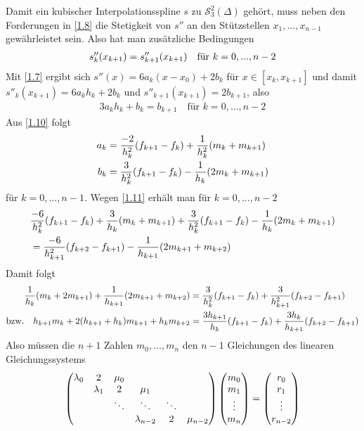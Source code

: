 Damit ein kubischer Interpolationsspline $s$ zu $\mathcal{S}^2_3(\Delta)$ gehört, muss neben den Forderungen in \cref{1.8} die Stetigkeit von $s''$ an den Stützstellen $x_1,...,x_{n-1}$ gewährleistet sein. Also hat man zusätzliche Bedingungen
\begin{align}
	s''_k(x_{k+1})=s''_{k+1}(x_{k+1})\quad\text{für } k=0,...,n-2\notag
\end{align}
Mit \cref{1.7} ergibt sich $s''(x)=6a_k(x-x_0)+2b_k$ für $x\in[x_k,x_{k+1}]$ und damit $s''_k(x_{k+1}) = 6a_kh_k+2b_k$ und $s''_{k+1}(x_{k+1})=2b_{k+1}$, also 
\begin{align}
	\label{1.11}
	3a_kh_k+b_k=b_{k+1}\quad\text{für }k=0,...,n-2
\end{align}
Aus \cref{1.10} folgt
\begin{align}
	a_k &= \frac{-2}{h_k^2}(f_{k+1}-f_k)+\frac{1}{h_k^2}(m_k+m_{k+1}) \notag \\
	b_k &= \frac{3}{h_k^2}(f_{k+1}-f_k)-\frac{1}{h_k}(2m_k+m_{k+1})\notag
\end{align}
für $k=0,...,n-1$. Wegen \cref{1.11} erhält man für $k=0,...,n-2$
\begin{align}
	& \frac{-6}{h_k^2}(f_{k+1}-f_k) + \frac{3}{h_k}(m_k+m_{k+1}) + \frac{3}{h_k^2}(f_{k+1}-f_k) - \frac{1}{h_k}(2m_k+m_{k+1}) \notag \\
	&= \frac{-6}{h^2_{k+1}}(f_{k+2}-f_{k+1})-\frac{1}{h_{k+1}}(2m_{k+1}+m_{k+2})\notag
\end{align}
Damit folgt 
\begin{align}
	\frac{1}{h_k}(m_k+2m_{k+1}) + \frac{1}{h_{k+1}}(2m_{k+1}+m_{k+2}) &= \frac{3}{h_k^2}(f_{k+1}-f_k) + \frac{3}{h_{k+1}^2}(f_{k+2}-f_{k+1})\notag \\
	\text{bzw.}\quad h_{k+1}m_k + 2(h_{k+1}+h_k)m_{k+1}+h_km_{k+2} &= \frac{3h_{k+1}}{h_k}(f_{k+1}-f_k) + \frac{3h_k}{h_{k+1}}(f_{k+2}-f_{k+1})\notag
\end{align}
Also müssen die $n+1$ Zahlen $m_0,...,m_n$ den $n-1$ Gleichungen des linearen Gleichungssystems 
\begin{align}
	\begin{pmatrix}
		\lambda_0 & 2 & \mu_0 & & & \\
		 & \lambda_1 & 2 & \mu_1 & & \\
		 & & \ddots & \ddots & \ddots & \\
		 & & & \lambda_{n-2} & 2 & \mu_{n-2}
	\end{pmatrix}
	\begin{pmatrix}
		m_0 \\ m_1 \\ \vdots \\ m_n
	\end{pmatrix}
	= \begin{pmatrix}
	 r_0 \\ r_1 \\ \vdots \\ r_{n-2}
	\end{pmatrix}\notag
\end{align}
